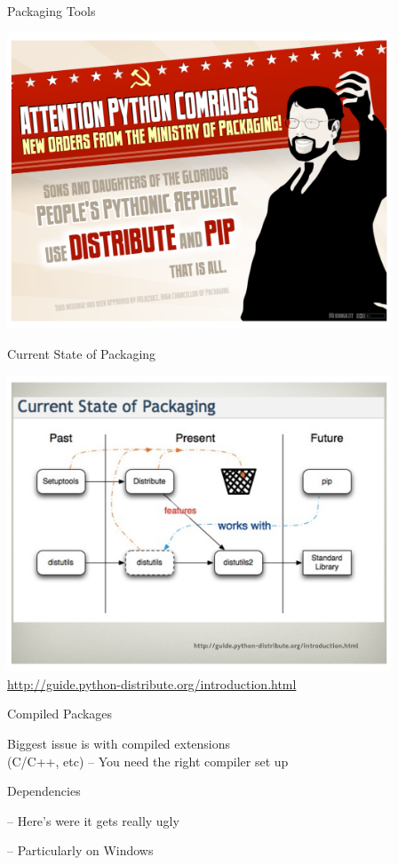 \documentclass{beamer}
\begin{document}
\begin{frame}[fragile]{Packaging Tools}

{\centering
\includegraphics[width=4.5in]{packaging1.pdf}
}

\end{frame} 

\begin{frame}[fragile]{Current State of Packaging}

{\centering
\includegraphics[width=4.5in]{PackagingCurrentState.pdf}
}
\vfill
\url{http://guide.python-distribute.org/introduction.html}
\end{frame} 

\begin{frame}[fragile]{Compiled Packages}

{\LARGE Biggest issue is with compiled extensions\\[0.1in]
\hfill(C/C++, etc)\hfill
}
\vfill
{\Large -- You need the right compiler set up}

\vfill
{\LARGE Dependencies}

\vfill
{\Large -- Here's were it gets really ugly}

\vfill
{\Large -- Particularly on Windows}

\end{frame} 
\end{document}
